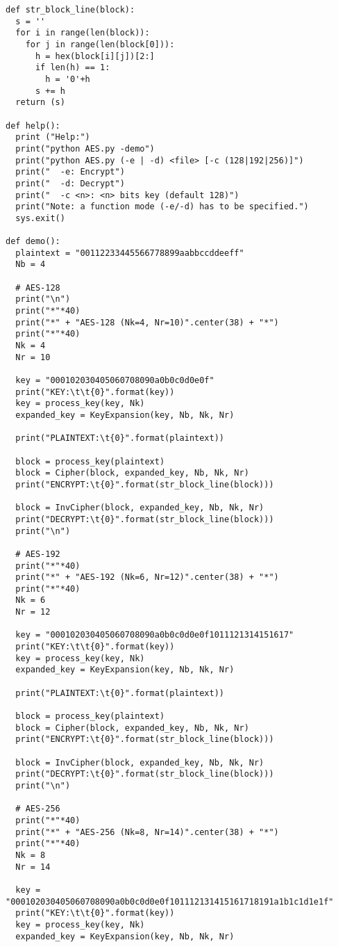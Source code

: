 \begin{verbatim}
def str_block_line(block):
  s = ''
  for i in range(len(block)):
    for j in range(len(block[0])):
      h = hex(block[i][j])[2:]
      if len(h) == 1:
        h = '0'+h
      s += h
  return (s)

def help():
  print ("Help:")
  print("python AES.py -demo")
  print("python AES.py (-e | -d) <file> [-c (128|192|256)]")
  print("  -e: Encrypt")
  print("  -d: Decrypt")
  print("  -c <n>: <n> bits key (default 128)")
  print("Note: a function mode (-e/-d) has to be specified.")
  sys.exit()

def demo():
  plaintext = "00112233445566778899aabbccddeeff"
  Nb = 4

  # AES-128
  print("\n")
  print("*"*40)
  print("*" + "AES-128 (Nk=4, Nr=10)".center(38) + "*")
  print("*"*40)
  Nk = 4
  Nr = 10

  key = "000102030405060708090a0b0c0d0e0f"
  print("KEY:\t\t{0}".format(key))
  key = process_key(key, Nk)
  expanded_key = KeyExpansion(key, Nb, Nk, Nr)

  print("PLAINTEXT:\t{0}".format(plaintext))

  block = process_key(plaintext)
  block = Cipher(block, expanded_key, Nb, Nk, Nr)
  print("ENCRYPT:\t{0}".format(str_block_line(block)))

  block = InvCipher(block, expanded_key, Nb, Nk, Nr)
  print("DECRYPT:\t{0}".format(str_block_line(block)))
  print("\n")

  # AES-192
  print("*"*40)
  print("*" + "AES-192 (Nk=6, Nr=12)".center(38) + "*")
  print("*"*40)
  Nk = 6
  Nr = 12

  key = "000102030405060708090a0b0c0d0e0f1011121314151617"
  print("KEY:\t\t{0}".format(key))
  key = process_key(key, Nk)
  expanded_key = KeyExpansion(key, Nb, Nk, Nr)

  print("PLAINTEXT:\t{0}".format(plaintext))

  block = process_key(plaintext)
  block = Cipher(block, expanded_key, Nb, Nk, Nr)
  print("ENCRYPT:\t{0}".format(str_block_line(block)))

  block = InvCipher(block, expanded_key, Nb, Nk, Nr)
  print("DECRYPT:\t{0}".format(str_block_line(block)))
  print("\n")

  # AES-256
  print("*"*40)
  print("*" + "AES-256 (Nk=8, Nr=14)".center(38) + "*")
  print("*"*40)
  Nk = 8
  Nr = 14

  key = "000102030405060708090a0b0c0d0e0f101112131415161718191a1b1c1d1e1f"
  print("KEY:\t\t{0}".format(key))
  key = process_key(key, Nk)
  expanded_key = KeyExpansion(key, Nb, Nk, Nr)


\end{verbatim}
